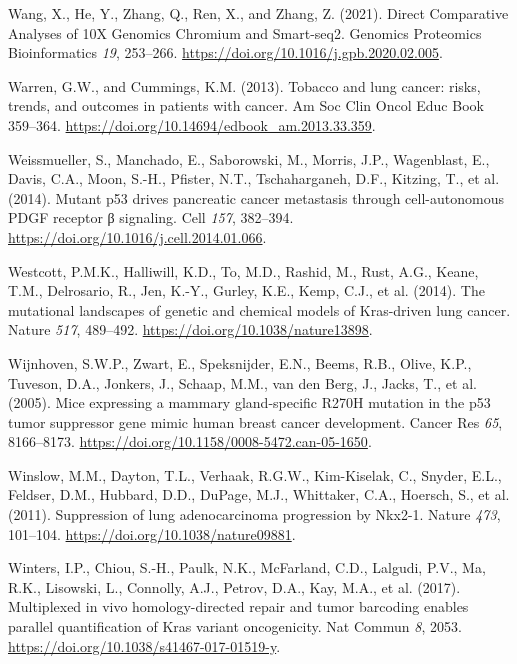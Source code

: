 \begin{CSLReferences}{0}{0}
\leavevmode{}%
Wang, X., He, Y., Zhang, Q., Ren, X., and Zhang, Z. (2021). Direct Comparative Analyses of 10X Genomics Chromium and Smart-seq2. Genomics Proteomics Bioinformatics \emph{19}, 253--266. \url{https://doi.org/10.1016/j.gpb.2020.02.005}.

\leavevmode{}%
Warren, G.W., and Cummings, K.M. (2013). Tobacco and lung cancer: risks, trends, and outcomes in patients with cancer. Am Soc Clin Oncol Educ Book 359--364. \url{https://doi.org/10.14694/edbook_am.2013.33.359}.

\leavevmode{}%
Weissmueller, S., Manchado, E., Saborowski, M., Morris, J.P., Wagenblast, E., Davis, C.A., Moon, S.-H., Pfister, N.T., Tschaharganeh, D.F., Kitzing, T., et al. (2014). Mutant p53 drives pancreatic cancer metastasis through cell-autonomous PDGF receptor β signaling. Cell \emph{157}, 382--394. \url{https://doi.org/10.1016/j.cell.2014.01.066}.

\leavevmode{}%
Westcott, P.M.K., Halliwill, K.D., To, M.D., Rashid, M., Rust, A.G., Keane, T.M., Delrosario, R., Jen, K.-Y., Gurley, K.E., Kemp, C.J., et al. (2014). The mutational landscapes of genetic and chemical models of Kras-driven lung cancer. Nature \emph{517}, 489--492. \url{https://doi.org/10.1038/nature13898}.

\leavevmode{}%
Wijnhoven, S.W.P., Zwart, E., Speksnijder, E.N., Beems, R.B., Olive, K.P., Tuveson, D.A., Jonkers, J., Schaap, M.M., van den Berg, J., Jacks, T., et al. (2005). Mice expressing a mammary gland-specific R270H mutation in the p53 tumor suppressor gene mimic human breast cancer development. Cancer Res \emph{65}, 8166--8173. \url{https://doi.org/10.1158/0008-5472.can-05-1650}.

\leavevmode{}%
Winslow, M.M., Dayton, T.L., Verhaak, R.G.W., Kim-Kiselak, C., Snyder, E.L., Feldser, D.M., Hubbard, D.D., DuPage, M.J., Whittaker, C.A., Hoersch, S., et al. (2011). Suppression of lung adenocarcinoma progression by Nkx2-1. Nature \emph{473}, 101--104. \url{https://doi.org/10.1038/nature09881}.

\leavevmode{}%
Winters, I.P., Chiou, S.-H., Paulk, N.K., McFarland, C.D., Lalgudi, P.V., Ma, R.K., Lisowski, L., Connolly, A.J., Petrov, D.A., Kay, M.A., et al. (2017). Multiplexed in vivo homology-directed repair and tumor barcoding enables parallel quantification of Kras variant oncogenicity. Nat Commun \emph{8}, 2053. \url{https://doi.org/10.1038/s41467-017-01519-y}.


\end{CSLReferences}
